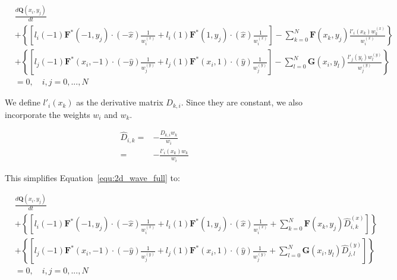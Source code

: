 \begin{equation} \label{equ:2d_wave_full}
	\begin{split}
        & \frac{d\mathbf{Q}(x_i, y_j)}{dt} \\
        & + \left\{ \left[ l_i \left( -1 \right) \mathbf{F}^* \left( -1, y_j \right) \cdot \left( -\widehat{x} \right) \frac{1}{w_i^{ \left( x \right) }} + l_i \left( 1 \right) \mathbf{F}^* \left( 1, y_j \right) \cdot
        \left( \widehat{x} \right) \frac{1}{w_i^{ \left( x \right) }} \right] - \sum_{k = 0}^{N} \mathbf{F} \left(x_k, y_j \right) \frac{l'_i \left( x_k \right) w_k^{ \left( x \right) }}{w_i^{ \left( x \right) }} \right\} \\
        & + \left\{ \left[ l_j \left( -1 \right) \mathbf{F}^* (x_i, -1) \cdot \left( -\widehat{y} \right) \frac{1}{w_j^{ \left( y \right) }} + l_j \left( 1 \right) \mathbf{F}^*(x_i, 1) \cdot
        \left( \widehat{y} \right) \frac{1}{w_j^{ \left( y \right) }} \right] - \sum_{l = 0}^{N} \mathbf{G} \left(x_i, y_l \right) \frac{l'_j \left( y_l \right) w_l^{ \left( y \right) }}{w_j^{ \left( y \right) }} \right\} \\
        & = 0, \quad i,j = 0, ..., N
	\end{split} 
\end{equation}

We define $l'_i(x_k)$ as the derivative matrix $D_{k, i}$. Since they are constant, we also
incorporate the weights $w_i$ and $w_k$.

\begin{equation} \label{equ:d_hat}
	\begin{split}
        \widehat{D}_{i,k} = & -\frac{D_{k, i} w_k}{w_i} \\
        = & -\frac{l'_i(x_k) w_k}{w_i}
	\end{split} 
\end{equation}

This simplifies Equation~\ref{equ:2d_wave_full} to:

\begin{equation} \label{equ:2d_wave_d}
	\begin{split}
        & \frac{d\mathbf{Q}(x_i, y_j)}{dt} \\
        & + \left\{ \left[ l_i \left( -1 \right) \mathbf{F}^* \left( -1, y_j \right) \cdot \left( -\widehat{x} \right) \frac{1}{w_i^{ \left( x \right) }} + l_i \left( 1 \right) \mathbf{F}^* \left( 1, y_j \right) \cdot
        \left( \widehat{x} \right) \frac{1}{w_i^{ \left( x \right) }} + \sum_{k = 0}^{N} \mathbf{F} \left( x_k, y_j \right) \widehat{D}_{i, k}^{ \left( x \right) } \right] \right\} \\
        & + \left \{ \left [ l_j \left( -1 \right) \mathbf{F}^* \left( x_i, -1 \right) \cdot \left( -\widehat{y} \right) \frac{1}{w_j^{ \left( y \right) }} + l_j \left( 1 \right) \mathbf{F}^* \left(x_i, 1 \right) \cdot
        \left( \widehat{y} \right) \frac{1}{w_j^{ \left( y \right) }} + \sum_{l = 0}^{N} \mathbf{G} \left( x_i, y_l \right) \widehat{D}_{j, l}^{ \left( y \right) } \right] \right\} \\
        & = 0, \quad i, j = 0, ..., N
	\end{split}
\end{equation}

